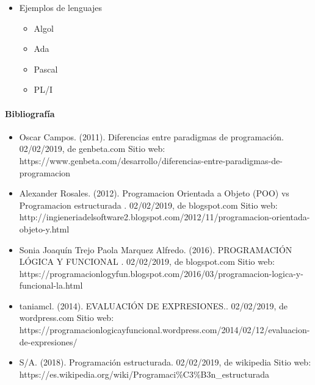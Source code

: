 \documentclass[10pt]{article}
\begin{document}
\begin{itemize}
\begin{itemize}
    \end{itemize}
  \item Ejemplos de lenguajes
    \begin{itemize}
      \item Algol
      \item Ada
      \item Pascal
      \item PL/I
    \end{itemize}
\end{itemize}

\paragraph{\normalsize Bibliografía}
  \begin{itemize}
    \item Oscar Campos. (2011). Diferencias entre paradigmas de programación. 02/02/2019, de genbeta.com Sitio web: https://www.genbeta.com/desarrollo/diferencias-entre-paradigmas-de-programacion
    \item Alexander Rosales. (2012). Programacion Orientada a Objeto (POO) vs Programacion estructurada . 02/02/2019, de blogspot.com Sitio web: http://ingieneriadelsoftware2.blogspot.com/2012/11/programacion-orientada-objeto-y.html
    \item Sonia Joaquín Trejo Paola Marquez Alfredo. (2016). PROGRAMACIÓN LÓGICA Y FUNCIONAL . 02/02/2019, de blogspot.com Sitio web: https://programacionlogyfun.blogspot.com/2016/03/programacion-logica-y-funcional-la.html
    \item taniamcl. (2014). EVALUACIÓN DE EXPRESIONES.. 02/02/2019, de wordpress.com Sitio web: https://programacionlogicayfuncional.wordpress.com/2014/02/12/evaluacion-de-expresiones/
    \item S/A. (2018). Programación estructurada. 02/02/2019, de wikipedia Sitio web: https://es.wikipedia.org/wiki/Programaci\%C3\%B3n\_estructurada
  \end{itemize}
	
\end{document}
